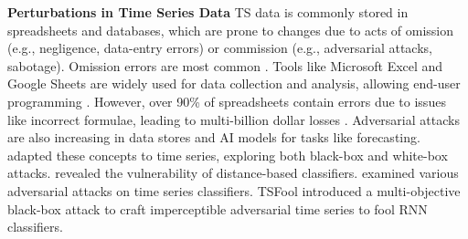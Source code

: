 \noindent \textbf{Perturbations in Time Series Data} TS data is commonly stored in spreadsheets and databases, which are prone to changes due to acts of omission (e.g., negligence, data-entry errors) or commission (e.g., adversarial attacks, sabotage). Omission errors are most common \cite{spreadsheets-errors-risks-survey}. Tools like Microsoft Excel and Google Sheets are widely used for data collection and analysis, allowing end-user programming \cite{spreadsheets-future-workshop}. However, over 90\% of spreadsheets contain errors due to issues like incorrect formulae, leading to multi-billion dollar losses \cite{spreadsheet-qa-survey}.
Adversarial attacks are also increasing in data stores and AI models for tasks like forecasting.
\cite{karim2019adversarial} adapted these concepts to time series, exploring both black-box and white-box attacks. \cite{oregi2018adversarial} revealed the vulnerability of distance-based classifiers. \cite{rathore2020untargeted} examined various adversarial attacks on time series classifiers. TSFool \cite{li2022tsfool} introduced a multi-objective black-box attack to craft imperceptible adversarial time series to fool RNN classifiers.

